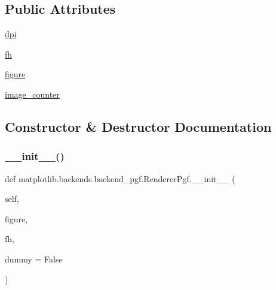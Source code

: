\subsection*{Public Attributes}
\begin{DoxyCompactItemize}
\item 
\hyperlink{classmatplotlib_1_1backends_1_1backend__pgf_1_1RendererPgf_a5d4bc4af6a4380e185908caf4ae8f077}{dpi}
\item 
\hyperlink{classmatplotlib_1_1backends_1_1backend__pgf_1_1RendererPgf_ab5681d558cdb788f9ad47df9b7a26c47}{fh}
\item 
\hyperlink{classmatplotlib_1_1backends_1_1backend__pgf_1_1RendererPgf_a485a85245a232fc23e71ab5bd7525db7}{figure}
\item 
\hyperlink{classmatplotlib_1_1backends_1_1backend__pgf_1_1RendererPgf_a0a01a7408f7402d16e09b89319663e90}{image\+\_\+counter}
\end{DoxyCompactItemize}


\subsection{Constructor \& Destructor Documentation}
\mbox{\label{classmatplotlib_1_1backends_1_1backend__pgf_1_1RendererPgf_a2a9e0ea44ccbc918897ad16033cc6738}} 
\subsubsection{\texorpdfstring{\+\_\+\+\_\+init\+\_\+\+\_\+()}{\_\_init\_\_()}}
{\footnotesize\ttfamily def matplotlib.\+backends.\+backend\+\_\+pgf.\+Renderer\+Pgf.\+\_\+\+\_\+init\+\_\+\+\_\+ (\begin{DoxyParamCaption}\item[{}]{self,  }\item[{}]{figure,  }\item[{}]{fh,  }\item[{}]{dummy = {\ttfamily False} }\end{DoxyParamCaption})}

